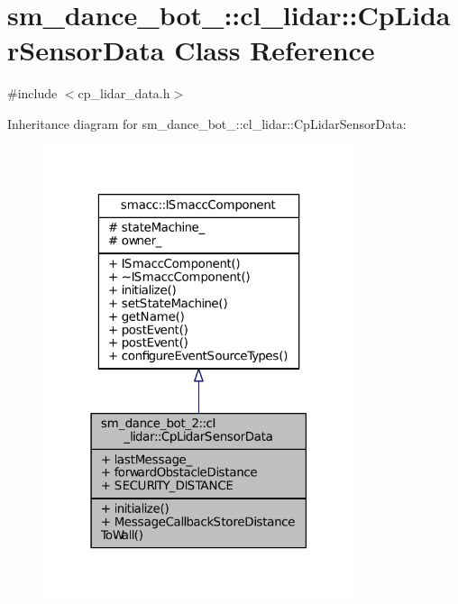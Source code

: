 \hypertarget{classsm__dance__bot__2_1_1cl__lidar_1_1CpLidarSensorData}{}\section{sm\+\_\+dance\+\_\+bot\+\_\+:\+:cl\+\_\+lidar\+:\+:Cp\+Lidar\+Sensor\+Data Class Reference}
\label{classsm__dance__bot__2_1_1cl__lidar_1_1CpLidarSensorData}


{\ttfamily \#include $<$cp\+\_\+lidar\+\_\+data.\+h$>$}



Inheritance diagram for sm\+\_\+dance\+\_\+bot\+\_\+:\+:cl\+\_\+lidar\+:\+:Cp\+Lidar\+Sensor\+Data\+:
\nopagebreak
\begin{figure}[H]
\begin{center}
\leavevmode
\includegraphics[width=259pt]{classsm__dance__bot__2_1_1cl__lidar_1_1CpLidarSensorData__inherit__graph}
\end{center}
\end{figure}


